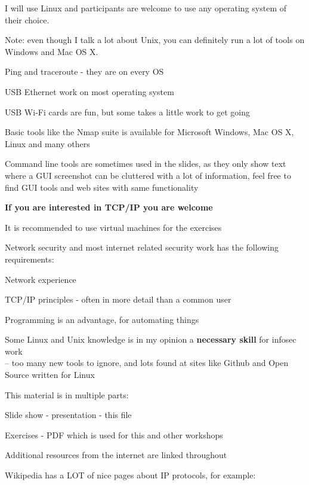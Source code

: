 \documentclass[Screen16to9,17pt]{foils}
\begin{document}

I will use Linux and participants are welcome to use any operating system of their choice.

Note: even though I talk a lot about Unix, you can definitely run a lot of tools on Windows and Mac OS X.

\begin{list2}
\item Ping and traceroute - they are on every OS
\item USB Ethernet work on most operating system
\item USB Wi-Fi cards are fun, but some takes a little work to get going
\item Basic tools like the Nmap suite is available for Microsoft Windows, Mac OS X, Linux and many others
\end{list2}

Command line tools are sometimes used in the slides, as they only show text where a GUI screenshot can be cluttered with a lot of information, feel free to find GUI tools and web sites with same functionality




\textbf{\LARGE If you are interested in TCP/IP you are welcome}

\vskip 1cm
\begin{list1}
\item It is recommended to use virtual machines for the exercises
\item Network security and most internet related security work has the following requirements:
\begin{list2}
\item Network experience
\item TCP/IP principles - often in more detail than a common user
\item Programming is an advantage, for automating things
\item Some Linux and Unix knowledge is in my opinion a {\bf necessary skill} for infosec work\\
-- too many new tools to ignore, and lots found at sites like Github and Open Source written for Linux
\end{list2}
\end{list1}





\begin{list2}
\item This material is in multiple parts:

\item Slide show - presentation - this file
\item Exercises - PDF which is used for this and other workshops
\item Additional resources from the internet are linked throughout
\item Wikipedia has a LOT of nice pages about IP protocols, for example:
\end{list2}
\end{document}
